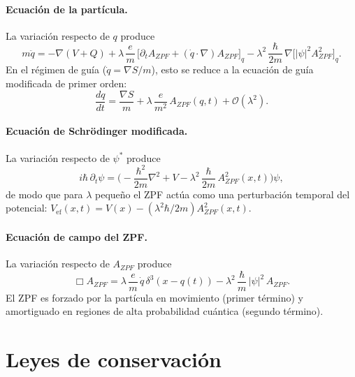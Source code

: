 \documentclass[11pt,a4paper]{article}
\begin{document}
\paragraph{Ecuación de la partícula.} La variación respecto de $q$ produce
\begin{equation}
m\ddot{q} = -\nabla(V+Q) + \lambda\,\frac{e}{m}\,
\big[\partial_t A_{ZPF} + (\dot{q}\cdot\nabla)A_{ZPF}\big]_q
- \lambda^2\,\frac{\hbar}{2m}\,\nabla\big[|\psi|^2 A^2_{ZPF}\big]_q.
\label{eq:particula_2do_orden}
\end{equation}
En el régimen de guía ($\dot{q}=\nabla S/m$), esto se reduce a la
ecuación de guía modificada de primer orden:
\begin{equation}
\frac{dq}{dt} = \frac{\nabla S}{m}
+ \lambda\,\frac{e}{m^2}\,A_{ZPF}(q,t) + \mathcal{O}(\lambda^2).
\label{eq:guia_modificada}
\end{equation}

\paragraph{Ecuación de Schrödinger modificada.} La variación respecto de
$\psi^*$ produce
\begin{equation}
i\hbar\,\partial_t\psi = \Big(-\frac{\hbar^2}{2m}\nabla^2 + V
- \lambda^2\,\frac{\hbar}{2m}\,A^2_{ZPF}(x,t)\Big)\psi,
\label{eq:schrodinger_mod}
\end{equation}
de modo que para $\lambda$ pequeño el ZPF actúa como una perturbación
temporal del potencial: $V_\text{ef}(x,t)=V(x)-(\lambda^2\hbar/2m)A^2_{ZPF}(x,t)$.

\paragraph{Ecuación de campo del ZPF.} La variación respecto de $A_{ZPF}$
produce
\begin{equation}
\Box A_{ZPF} = \lambda\,\frac{e}{m}\,\dot{q}\,\delta^3(x-q(t))
- \lambda^2\,\frac{\hbar}{m}\,|\psi|^2\,A_{ZPF}.
\label{eq:campo_ZPF}
\end{equation}
El ZPF es forzado por la partícula en movimiento (primer término) y
amortiguado en regiones de alta probabilidad cuántica (segundo término).

\section{Leyes de conservación}
\label{sec:conservacion}
\end{document}
